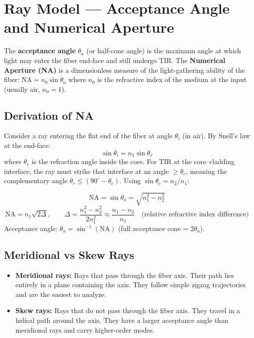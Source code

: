 \documentclass[12pt,a4paper]{article}
\begin{document}
\section{Ray Model --- Acceptance Angle and Numerical Aperture}

\begin{tcolorbox}[defbox, title={\textbf{Numerical Aperture (NA) and Acceptance Angle}}]
The \textbf{acceptance angle} $\theta_a$ (or half-cone angle) is the maximum angle at which light may enter the fiber end-face and still undergo TIR. The \textbf{Numerical Aperture (NA)} is a dimensionless measure of the light-gathering ability of the fiber: $\text{NA} = n_0 \sin\theta_a$ where $n_0$ is the refractive index of the medium at the input (usually air, $n_0 = 1$).
\end{tcolorbox}

\subsection{Derivation of NA}
Consider a ray entering the flat end of the fiber at angle $\theta_i$ (in air). By Snell's law at the end-face:
\[
\sin\theta_i = n_1 \sin\theta_r
\]
where $\theta_r$ is the refraction angle inside the core. For TIR at the core--cladding interface, the ray must strike that interface at an angle $\geq \theta_c$, meaning the complementary angle $\theta_r \leq (90^\circ - \theta_c)$. Using $\sin\theta_c = n_2/n_1$:

\begin{tcolorbox}[formulabox, title={\textbf{Numerical Aperture --- Complete Formula}}]
\[
\text{NA} = \sin\theta_a = \sqrt{n_1^2 - n_2^2}
\]
\[
\text{NA} = n_1\sqrt{2\Delta}, \qquad \Delta = \frac{n_1^2 - n_2^2}{2n_1^2} \approx \frac{n_1 - n_2}{n_1} \quad \text{(relative refractive index difference)}
\]
Acceptance angle: $\theta_a = \sin^{-1}(\text{NA})$ \quad (full acceptance cone = $2\theta_a$).
\end{tcolorbox}

\subsection{Meridional vs Skew Rays}
\begin{itemize}[leftmargin=*, itemsep=3pt]
  \item \textbf{Meridional rays:} Rays that pass through the fiber axis. Their path lies entirely in a plane containing the axis. They follow simple zigzag trajectories and are the easiest to analyze.
  \item \textbf{Skew rays:} Rays that do not pass through the fiber axis. They travel in a helical path around the axis. They have a larger acceptance angle than meridional rays and carry higher-order modes.
\end{itemize}
\end{document}
